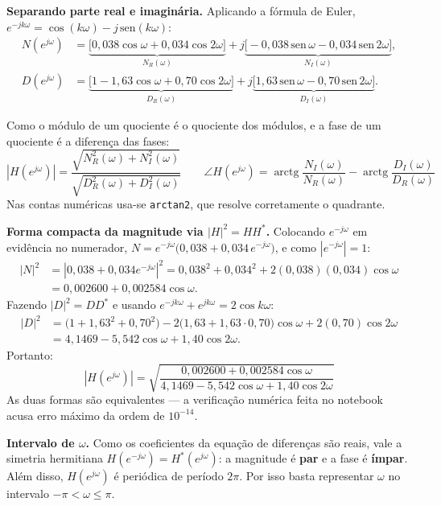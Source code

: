 \documentclass[12pt]{article}
\begin{document}
\noindent\textbf{Separando parte real e imaginária.} Aplicando a fórmula de Euler,
$e^{-jk\omega} = \cos(k\omega) - j\,\mathrm{sen}(k\omega)$:
\[
\begin{aligned}
N(e^{j\omega}) &= \underbrace{\big[0{,}038\cos\omega + 0{,}034\cos 2\omega\big]}_{N_R(\omega)}
 + j\underbrace{\big[-0{,}038\,\mathrm{sen}\,\omega - 0{,}034\,\mathrm{sen}\,2\omega\big]}_{N_I(\omega)},\\[2mm]
D(e^{j\omega}) &= \underbrace{\big[1 - 1{,}63\cos\omega + 0{,}70\cos 2\omega\big]}_{D_R(\omega)}
 + j\underbrace{\big[1{,}63\,\mathrm{sen}\,\omega - 0{,}70\,\mathrm{sen}\,2\omega\big]}_{D_I(\omega)}.
\end{aligned}
\]

Como o módulo de um quociente é o quociente dos módulos, e a fase de um quociente é a
diferença das fases:
\[
\boxed{
\left|H(e^{j\omega})\right| =
\frac{\sqrt{N_R^2(\omega) + N_I^2(\omega)}}{\sqrt{D_R^2(\omega) + D_I^2(\omega)}}
}
\qquad
\boxed{
\angle H(e^{j\omega}) =
\operatorname{arctg}\frac{N_I(\omega)}{N_R(\omega)}
- \operatorname{arctg}\frac{D_I(\omega)}{D_R(\omega)}
}
\]
Nas contas numéricas usa-se \texttt{arctan2}, que resolve corretamente o quadrante.

\medskip
\noindent\textbf{Forma compacta da magnitude via $|H|^2 = HH^{*}$.} Colocando
$e^{-j\omega}$ em evidência no numerador,
$N = e^{-j\omega}\big(0{,}038 + 0{,}034\,e^{-j\omega}\big)$, e como
$|e^{-j\omega}| = 1$:
\[
\begin{aligned}
|N|^2 &= \left|0{,}038 + 0{,}034e^{-j\omega}\right|^2
= 0{,}038^2 + 0{,}034^2 + 2(0{,}038)(0{,}034)\cos\omega\\
      &= 0{,}002600 + 0{,}002584\cos\omega.
\end{aligned}
\]
Fazendo $|D|^2 = DD^{*}$ e usando $e^{-jk\omega} + e^{jk\omega} = 2\cos k\omega$:
\[
\begin{aligned}
|D|^2 &= \big(1 + 1{,}63^2 + 0{,}70^2\big)
 - 2\big(1{,}63 + 1{,}63 \cdot 0{,}70\big)\cos\omega + 2(0{,}70)\cos 2\omega\\
      &= 4{,}1469 - 5{,}542\cos\omega + 1{,}40\cos 2\omega.
\end{aligned}
\]
Portanto:
\[
\boxed{
\left|H(e^{j\omega})\right| =
\sqrt{\frac{0{,}002600 + 0{,}002584\cos\omega}
           {4{,}1469 - 5{,}542\cos\omega + 1{,}40\cos 2\omega}}
}
\]
As duas formas são equivalentes --- a verificação numérica feita no notebook acusa
erro máximo da ordem de $10^{-14}$.

\medskip
\noindent\textbf{Intervalo de $\omega$.} Como os coeficientes da equação de diferenças
são reais, vale a simetria hermitiana $H(e^{-j\omega}) = H^{*}(e^{j\omega})$: a
magnitude é \textbf{par} e a fase é \textbf{ímpar}. Além disso, $H(e^{j\omega})$ é
periódica de período $2\pi$. Por isso basta representar $\omega$ no intervalo
$-\pi < \omega \le \pi$.
\end{document}
